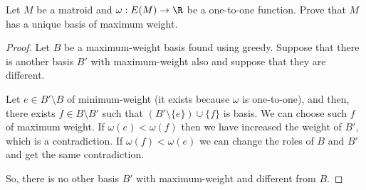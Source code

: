 \prob
{
    Let $M$ be a matroid and $\omega: E(M) \rightarrow \R$ be a one-to-one function. 
    Prove that $M$ has a unique basis of maximum weight.
}
\begin{proof}
    Let $B$ be a maximum-weight basis found using greedy. Suppose that there is another basis $B'$ with maximum-weight also and
    suppose that they are different.\pn
    
    Let $e \in B' \setminus B$ of minimum-weight (it exists because $\omega$ is one-to-one), and then, there exists $f \in B \setminus B'$ such that
    $(B' \setminus \{e\}) \cup  \{f\}$ is basis. We can choose such $f$ of maximum weight. If $\omega(e) < \omega(f)$ then we have increased the 
    weight of $B'$, which is a contradiction. If $\omega(f) < \omega(e)$ we can change the roles of $B$ and $B'$ and get the same contradiction.\pn
    
    So, there is no other basis $B'$ with maximum-weight and different from $B$.
\end{proof}